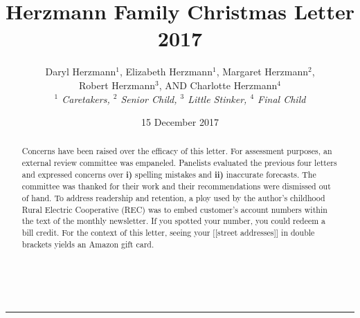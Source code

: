 \documentclass[letterpaper,11pt]{article}
\title{\vspace{-2.0cm}Herzmann Family Christmas Letter 2017}
\author{Daryl Herzmann${}^1$, Elizabeth Herzmann${}^1$, Margaret 
Herzmann${}^2$,\\
Robert Herzmann${}^3$, AND Charlotte Herzmann${}^4$ \\
\it{${}^1$ Caretakers},
\it{${}^2$ Senior Child},
\it{${}^3$ Little Stinker},
\it{${}^4$ Final Child}}
\date{15 December 2017}
\newcommand{\Line}[0]{%
  \rule{0cm}{0cm}\\\hrule\rule{0cm}{0cm}%
}
\begin{document}
\maketitle
\vspace{-0.75cm}
\begin{abstract}
Concerns have been raised over the efficacy of this letter. For assessment
purposes, an external review committee was empaneled.  Panelists evaluated the
previous four letters and expressed concerns over \textbf{i)} spelling mistakes
and \textbf{ii)} inaccurate forecasts.  The committee was thanked for their
work and their recommendations were dismissed out of hand.  To address
readership and retention, a ploy used by the author's childhood Rural Electric Cooperative (REC) was to
embed customer's account numbers within the text of the monthly newsletter.  If
you spotted your number, you could redeem a bill credit.  For the context of this
letter, seeing your [[street addresses]] in double brackets yields an Amazon
gift card.
\end{abstract}

\vspace{-0.5cm}
\Line
\end{document}
